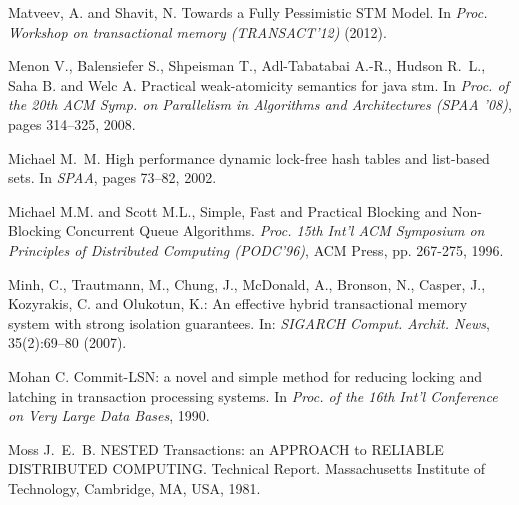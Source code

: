\begin{thebibliography}{99}
{
Matveev, A. and  Shavit, N.
Towards a Fully Pessimistic STM Model. 
In {\it Proc. Workshop on transactional memory (TRANSACT'12)} (2012).


Menon V., Balensiefer S., Shpeisman T., Adl-Tabatabai A.-R., Hudson R.~L., Saha B. and Welc A.
\newblock Practical weak-atomicity semantics for java stm.
\newblock In {\em Proc. of the 20th ACM Symp. on Parallelism in Algorithms and
  Architectures (SPAA '08)}, pages 314--325, 2008.



Michael M.~M.
\newblock High performance dynamic lock-free hash tables and list-based sets.
\newblock In {\em SPAA}, pages 73--82, 2002.





Michael M.M.  and Scott M.L., 
Simple, Fast and Practical Blocking and Non-Blocking Concurrent
Queue Algorithms.
{\it  Proc. 15th  Int'l  ACM Symposium on Principles of  Distributed 
Computing (PODC'96)},  ACM Press, pp. 267-275,  1996. 



Minh, C., Trautmann, M., Chung, J., McDonald, A., Bronson, N., Casper, J., Kozyrakis, C. and Olukotun, K.:
An effective hybrid transactional memory system with strong isolation guarantees.
In: {\it SIGARCH Comput. Archit. News}, 35(2):69--80 (2007).





Mohan C.
\newblock Commit-{LSN}: a novel and simple method for reducing locking and
  latching in transaction processing systems.
\newblock In {\em Proc. of the 16th Int'l Conference on Very Large Data Bases},
  1990.




Moss J.~E.~B.
\newblock NESTED Transactions: an APPROACH to RELIABLE DISTRIBUTED COMPUTING.
\newblock Technical Report. Massachusetts Institute of Technology, Cambridge, MA, USA, 1981.

}
\end{thebibliography}
